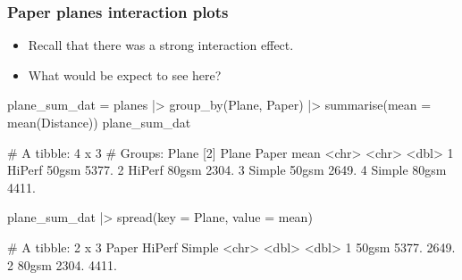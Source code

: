 \documentclass[a4paper]{article}
\begin{document}
\subsubsection{Paper planes interaction plots}
\begin{itemize}
	\item Recall that there was a strong interaction effect.
	\item What would be expect to see here?
\end{itemize}
\begin{minipage}[t]{0.49\textwidth}
\begin{Schunk}
\begin{Sinput}
plane_sum_dat = planes |> 
  group_by(Plane, Paper) |> 
  summarise(mean = mean(Distance))
plane_sum_dat
\end{Sinput}
\begin{Soutput}
# A tibble: 4 x 3
# Groups:   Plane [2]
  Plane  Paper  mean
  <chr>  <chr> <dbl>
1 HiPerf 50gsm 5377.
2 HiPerf 80gsm 2304.
3 Simple 50gsm 2649.
4 Simple 80gsm 4411.
\end{Soutput}
\end{Schunk}
\end{minipage}
\hspace{0.02\textwidth}
\begin{minipage}[t]{0.49\textwidth}
\begin{Schunk}
\begin{Sinput}
plane_sum_dat |> 
  spread(key = Plane, value = mean)
\end{Sinput}
\begin{Soutput}
# A tibble: 2 x 3
  Paper HiPerf Simple
  <chr>  <dbl>  <dbl>
1 50gsm  5377.  2649.
2 80gsm  2304.  4411.
\end{Soutput}
\end{Schunk}
\end{minipage}
\end{document}
